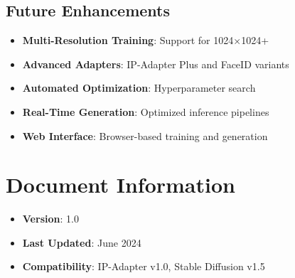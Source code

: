 \documentclass[11pt,a4paper]{article}
\begin{document}
\subsection{Future Enhancements}

\begin{itemize}
    \item \textbf{Multi-Resolution Training}: Support for 1024×1024+
    \item \textbf{Advanced Adapters}: IP-Adapter Plus and FaceID variants
    \item \textbf{Automated Optimization}: Hyperparameter search
    \item \textbf{Real-Time Generation}: Optimized inference pipelines
    \item \textbf{Web Interface}: Browser-based training and generation
\end{itemize}

\section*{Document Information}

\begin{itemize}
    \item \textbf{Version}: 1.0
    \item \textbf{Last Updated}: June 2024
    \item \textbf{Compatibility}: IP-Adapter v1.0, Stable Diffusion v1.5
\end{itemize}
\end{document}
